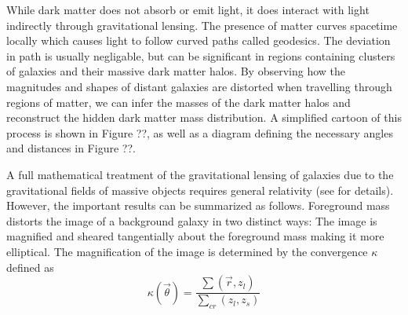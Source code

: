 \documentclass[%
 reprint,
 amsmath,amssymb,
 aps,nofootinbib
]{revtex4-1}
\begin{document}
While dark matter does not absorb or emit light, it does interact with light indirectly through gravitational lensing. The presence of matter curves spacetime locally which causes light to follow curved paths called geodesics. The deviation in path is usually negligable, but can be significant in regions containing clusters of galaxies and their massive dark matter halos. By observing how the magnitudes and shapes of distant galaxies are distorted when travelling through regions of matter, we can infer the masses of the dark matter halos and reconstruct the hidden dark matter mass distribution. A simplified cartoon of this process is shown in Figure ??, as well as a diagram defining the necessary angles and distances in Figure ??.


A full mathematical treatment of the gravitational lensing of galaxies due to the gravitational fields of massive objects requires general relativity (see \cite{modern_cosmology} for details). However, the important results can be summarized as follows. Foreground mass distorts the image of a background galaxy in two distinct ways: The image is magnified and sheared tangentially about the foreground mass making it more elliptical. The magnification of the image is determined by the convergence $\kappa$ defined as
\begin{equation}\label{convergence}
\kappa(\vec{\theta})=\frac{\sum(\vec{r},z_l)}{\sum_{cr}(z_l,z_s)}
\end{equation}
\end{document}
